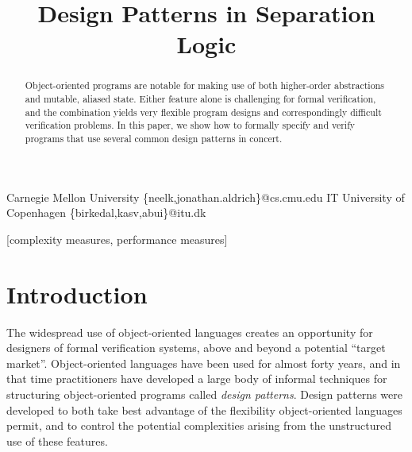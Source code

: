 \documentclass[preprint,natbib]{sigplanconf}
\begin{document}
\copyrightdata{[to be supplied]} 


\title{Design Patterns in Separation Logic}

           {Carnegie Mellon University}
           {\{neelk,jonathan.aldrich\}@cs.cmu.edu}
           {IT University of Copenhagen}
           {\{birkedal,kasv,abui\}@itu.dk}

\maketitle

\begin{abstract}
Object-oriented programs are notable for making use of both
higher-order abstractions and mutable, aliased state. Either feature
alone is challenging for formal verification, and the combination
yields very flexible program designs and correspondingly difficult
verification problems. In this paper, we show how to
formally specify and verify programs that use several common design
patterns in concert.
\end{abstract}

[complexity measures, performance measures]



\section{Introduction}

The widespread use of object-oriented languages creates an opportunity
for designers of formal verification systems, above and beyond a
potential ``target market''. Object-oriented languages have been used
for almost forty years, and in that time practitioners have developed
a large body of informal techniques for structuring object-oriented
programs called \emph{design patterns}\cite{GoF}.  Design patterns
were developed to both take best advantage of the flexibility
object-oriented languages permit, and to control the potential
complexities arising from the unstructured use of these features.
\end{document}
